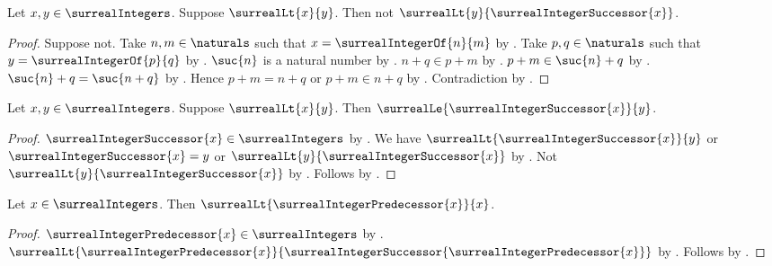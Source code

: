 \begin{theorem}\label{surreal_integer_no_between_successors}
    Let $x,y\in\surrealIntegers$.
    Suppose $\surrealLt{x}{y}$.
    Then not
        $\surrealLt{y}{\surrealIntegerSuccessor{x}}$.
\end{theorem}
\begin{proof}
    Suppose not.
    Take $n,m\in\naturals$ such that
        $x=\surrealIntegerOf{n}{m}$
        by .
    Take $p,q\in\naturals$ such that
        $y=\surrealIntegerOf{p}{q}$
        by .
    $\suc{n}$ is a natural number by .
    $n+q\in p+m$ by .
    $p+m\in\suc{n}+q$
        by .
    $\suc{n}+q=\suc{n+q}$
        by .
    Hence $p+m=n+q$ or $p+m\in n+q$ by .
    Contradiction by .
\end{proof}

\begin{theorem}\label{surreal_integer_successor_is_least_greater}
    Let $x,y\in\surrealIntegers$.
    Suppose $\surrealLt{x}{y}$.
    Then $\surrealLe{\surrealIntegerSuccessor{x}}{y}$.
\end{theorem}
\begin{proof}
    $\surrealIntegerSuccessor{x}\in\surrealIntegers$
        by .
    We have
        $\surrealLt{\surrealIntegerSuccessor{x}}{y}$ or
        $\surrealIntegerSuccessor{x}=y$ or
        $\surrealLt{y}{\surrealIntegerSuccessor{x}}$
        by .
    Not $\surrealLt{y}{\surrealIntegerSuccessor{x}}$
        by .
    Follows by .
\end{proof}

\begin{theorem}\label{surreal_integer_predecessor_lt}
    Let $x\in\surrealIntegers$.
    Then $\surrealLt{\surrealIntegerPredecessor{x}}{x}$.
\end{theorem}
\begin{proof}
    $\surrealIntegerPredecessor{x}\in\surrealIntegers$
        by .
    $\surrealLt
        {\surrealIntegerPredecessor{x}}
        {\surrealIntegerSuccessor{\surrealIntegerPredecessor{x}}}$
        by .
    Follows by .
\end{proof}

